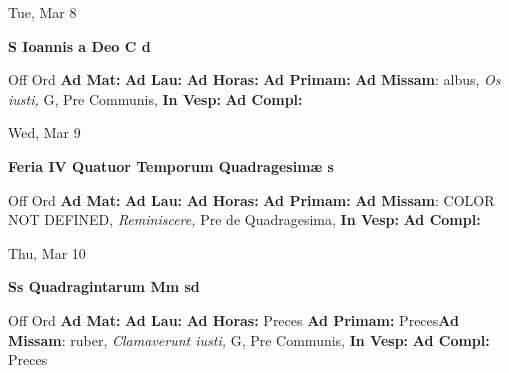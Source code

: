 \documentclass[10pt]{book}
\begin{document}
\begin{center}
\begin{minipage}{3.5in}
\vspace{2em}
\begin{center}Tue, Mar 8
\end{center}
\textbf{ \large S Ioannis a Deo C
\textnormal{\normalsize d}}

\begin{justify}Off Ord
\textbf{Ad Mat: }
\textbf{Ad Lau: }
\textbf{Ad Horas: }
\textbf{Ad Primam: }\textbf{Ad Missam}: albus, \textit{Os iusti,} G, Pre Communis, 
\textbf{In Vesp: }
\textbf{Ad Compl: }
\end{justify}
\end{minipage}
\end{center}

\begin{center}
\begin{minipage}{3.5in}
\vspace{2em}
\begin{center}Wed, Mar 9
\end{center}
\textbf{ \large Feria IV Quatuor Temporum Quadragesimæ
\textnormal{\normalsize s}}

\begin{justify}Off Ord
\textbf{Ad Mat: }
\textbf{Ad Lau: }
\textbf{Ad Horas: }
\textbf{Ad Primam: }\textbf{Ad Missam}: COLOR NOT DEFINED, \textit{Reminiscere,} Pre de Quadragesima, 
\textbf{In Vesp: }
\textbf{Ad Compl: }
\end{justify}
\end{minipage}
\end{center}

\begin{center}
\begin{minipage}{3.5in}
\vspace{2em}
\begin{center}Thu, Mar 10
\end{center}
\textbf{ \large Ss Quadragintarum Mm
\textnormal{\normalsize sd}}

\begin{justify}Off Ord
\textbf{Ad Mat: }
\textbf{Ad Lau: }
\textbf{Ad Horas: }Preces
\textbf{Ad Primam: }Preces\textbf{Ad Missam}: ruber, \textit{Clamaverunt iusti,} G, Pre Communis, 
\textbf{In Vesp: }
\textbf{Ad Compl: }Preces
\end{justify}
\end{minipage}
\end{center}
\end{document}
